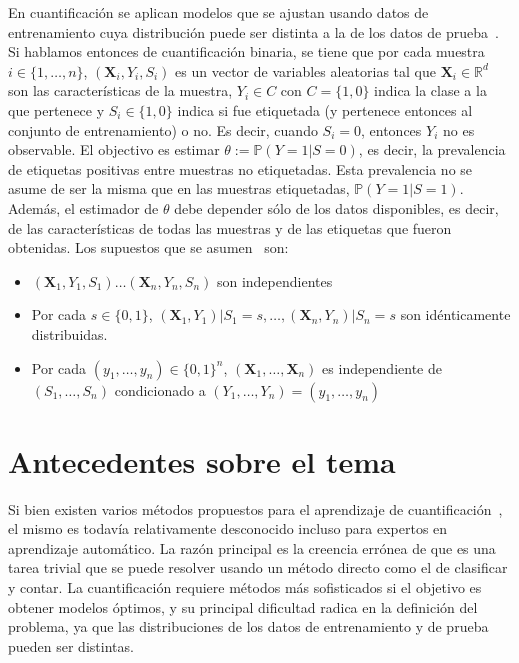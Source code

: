 \documentclass[a4paper, twoside, 11pt, spanish]{article}
\begin{document}
En cuantificación se aplican modelos que se ajustan usando datos de
entrenamiento cuya distribución puede ser distinta a la de los datos de
prueba~\cite{forman2005counting}. Si hablamos entonces de cuantificación
binaria, se tiene que por cada muestra $i \in \{1,\dots,n\}$,
$(\boldsymbol{X}_i,Y_i,S_i)$ es un vector de variables aleatorias tal que
$\boldsymbol{X}_i \in \mathbb{R}^d$ son las características de la muestra, $Y_i
\in C$ con $C=\{1,0\}$ indica la clase a la que pertenece y $S_i \in \{1,0\}$
indica si fue etiquetada (y pertenece entonces al conjunto de entrenamiento) o
no. Es decir, cuando $S_i=0$, entonces $Y_i$ no es observable. El objectivo es
estimar $\theta:= \mathbb{P}(Y=1|S=0)$, es decir, la prevalencia de etiquetas
positivas entre muestras no etiquetadas. Esta prevalencia no se asume de ser la
misma que en las muestras etiquetadas, $\mathbb{P}(Y=1|S=1)$. Además, el
estimador de $\theta$ debe depender sólo de los datos disponibles, es decir, de
las características de todas las muestras y de las etiquetas que fueron
obtenidas. Los supuestos que se asumen~\cite{vaz2019quantification} son:

\begin{itemize}
  \item $(\boldsymbol{X}_1,Y_1,S_1) \dots (\boldsymbol{X}_n,Y_n,S_n)$ son
  independientes
  \item Por cada $s \in \{0,1\}$,
  $(\boldsymbol{X}_1,Y_1)|S_1=s,\dots,(\boldsymbol{X}_n,Y_n)|S_n=s$ son
  idénticamente distribuidas.
  \item Por cada $(y_1,\dots,y_n)\in{\{0,1\}}^n$,
  $(\boldsymbol{X}_1,\dots,\boldsymbol{X}_n)$ es independiente de
  $(S_1,\dots,S_n)$ condicionado a $(Y_1,\dots,Y_n)=(y_1,\dots,y_n)$
\end{itemize}

\section*{Antecedentes sobre el tema}

Si bien existen varios métodos propuestos para el aprendizaje de
cuantificación~\cite{esuli2023learning, gonzalez2017review}, el mismo es todavía
relativamente desconocido incluso para expertos en aprendizaje automático. La
razón principal es la creencia errónea de que es una tarea trivial que se puede
resolver usando un método directo como el de clasificar y contar. La
cuantificación requiere métodos más sofisticados si el objetivo es obtener
modelos óptimos, y su principal dificultad radica en la definición del problema,
ya que las distribuciones de los datos de entrenamiento y de prueba pueden ser
distintas.
\end{document}
